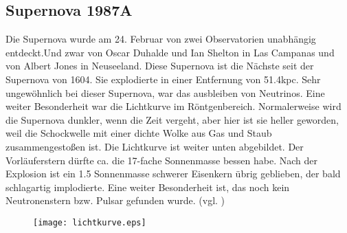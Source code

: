\subsection{Supernova 1987A}
Die Supernova wurde am 24. Februar von zwei Observatorien unabhängig entdeckt.Und zwar von Oscar Duhalde und Ian Shelton in Las Campanas und von Albert Jones in Neuseeland. Diese Supernova ist die Nächste seit der Supernova von 1604. Sie explodierte in einer Entfernung von 51.4kpc. Sehr ungewöhnlich bei dieser Supernova, war das ausbleiben von Neutrinos. Eine weiter Besonderheit war die Lichtkurve im Röntgenbereich. Normalerweise wird die Supernova dunkler, wenn die Zeit vergeht, aber hier ist sie heller geworden, weil die Schockwelle mit einer dichte Wolke aus Gas und Staub zusammengestoßen ist. Die Lichtkurve ist weiter unten abgebildet. Der Vorläuferstern dürfte ca. die 17-fache Sonnenmasse bessen habe. Nach der Explosion ist ein 1.5 Sonnenmasse schwerer Eisenkern übrig geblieben, der bald schlagartig implodierte. Eine weiter Besonderheit ist, das noch kein Neutronenstern bzw. Pulsar gefunden wurde. (vgl. \cite{bionta1987observation})

\begin{figure}[ht]
\begin{center}
\texttt{[image: lichtkurve.eps]}
\end{center}
\end{figure}
